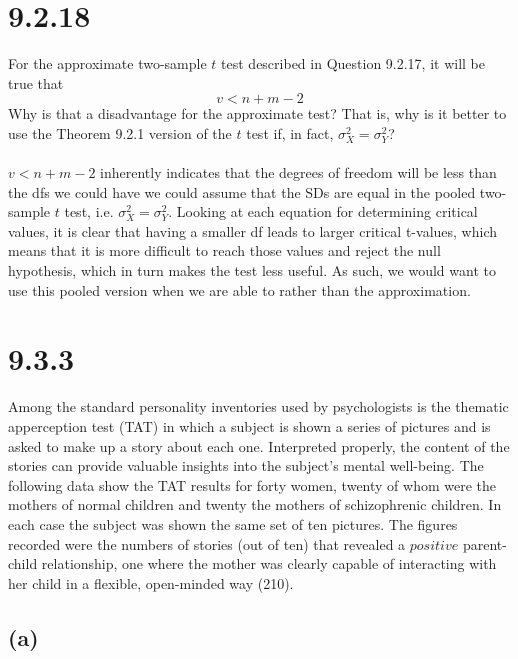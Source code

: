 \documentclass{article}
\begin{document}
{\section*{9.2.18}

For the approximate two-sample \(t\) test described in Question 9.2.17, it will be true that 
\[
v < n + m - 2
\]
Why is that a disadvantage for the approximate test? That is, why is it better to use the Theorem 9.2.1 version of the \(t\) test if, in fact, \(\sigma^2_X = \sigma^2_Y\)?
\\
\\
\(v < n + m - 2\) inherently indicates that the degrees of freedom will be less than the dfs we could have we could assume that the SDs are equal in the pooled two-sample \(t\) test, i.e. \(\sigma^2_X = \sigma^2_Y\). Looking at each equation for determining critical values, it is clear that having a smaller df leads to larger critical t-values, which means that it is more difficult to reach those values and reject the null hypothesis, which in turn makes the test less useful. As such, we would want to use this pooled version when we are able to rather than the approximation.

\section*{9.3.3}

Among the standard personality inventories used by psychologists is the thematic apperception test (TAT) in which a subject is shown a series of pictures and is asked to make up a story about each one. Interpreted properly, the content of the stories can provide valuable insights into the subject's mental well-being. The following data show the TAT results for forty women, twenty of whom were the mothers of normal children and twenty the mothers of schizophrenic children. In each case the subject was shown the same set of ten pictures. The figures recorded were the numbers of stories (out of ten) that revealed a \(positive\) parent-child relationship, one where the mother was clearly capable of interacting with her child in a flexible, open-minded way (210).

\subsection*{(a)}

}
\end{document}
